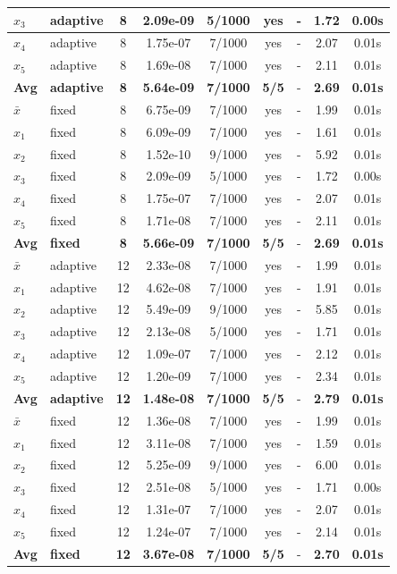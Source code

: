 \begin{longtable}{|l|l|c|c|c|c|c|c|c|}
\hline
$x_3$ & adaptive & 8 & 2.09e-09 & 5/1000 & yes & - & 1.72 & 0.00s \\
\hline
$x_4$ & adaptive & 8 & 1.75e-07 & 7/1000 & yes & - & 2.07 & 0.01s \\
\hline
$x_5$ & adaptive & 8 & 1.69e-08 & 7/1000 & yes & - & 2.11 & 0.01s \\
\hline
\hline\hline
\textbf{Avg} & \textbf{adaptive} & \textbf{8} & \textbf{5.64e-09} & \textbf{7/1000} & \textbf{5/5} & - & \textbf{2.69} & \textbf{0.01s} \\
\hline\hline
\hline
$\bar{x}$ & fixed & 8 & 6.75e-09 & 7/1000 & yes & - & 1.99 & 0.01s \\
\hline
$x_1$ & fixed & 8 & 6.09e-09 & 7/1000 & yes & - & 1.61 & 0.01s \\
\hline
$x_2$ & fixed & 8 & 1.52e-10 & 9/1000 & yes & - & 5.92 & 0.01s \\
\hline
$x_3$ & fixed & 8 & 2.09e-09 & 5/1000 & yes & - & 1.72 & 0.00s \\
\hline
$x_4$ & fixed & 8 & 1.75e-07 & 7/1000 & yes & - & 2.07 & 0.01s \\
\hline
$x_5$ & fixed & 8 & 1.71e-08 & 7/1000 & yes & - & 2.11 & 0.01s \\
\hline
\hline\hline
\textbf{Avg} & \textbf{fixed} & \textbf{8} & \textbf{5.66e-09} & \textbf{7/1000} & \textbf{5/5} & - & \textbf{2.69} & \textbf{0.01s} \\
\hline\hline
$\bar{x}$ & adaptive & 12 & 2.33e-08 & 7/1000 & yes & - & 1.99 & 0.01s \\
\hline
$x_1$ & adaptive & 12 & 4.62e-08 & 7/1000 & yes & - & 1.91 & 0.01s \\
\hline
$x_2$ & adaptive & 12 & 5.49e-09 & 9/1000 & yes & - & 5.85 & 0.01s \\
\hline
$x_3$ & adaptive & 12 & 2.13e-08 & 5/1000 & yes & - & 1.71 & 0.01s \\
\hline
$x_4$ & adaptive & 12 & 1.09e-07 & 7/1000 & yes & - & 2.12 & 0.01s \\
\hline
$x_5$ & adaptive & 12 & 1.20e-09 & 7/1000 & yes & - & 2.34 & 0.01s \\
\hline
\hline\hline
\textbf{Avg} & \textbf{adaptive} & \textbf{12} & \textbf{1.48e-08} & \textbf{7/1000} & \textbf{5/5} & - & \textbf{2.79} & \textbf{0.01s} \\
\hline\hline
\hline
$\bar{x}$ & fixed & 12 & 1.36e-08 & 7/1000 & yes & - & 1.99 & 0.01s \\
\hline
$x_1$ & fixed & 12 & 3.11e-08 & 7/1000 & yes & - & 1.59 & 0.01s \\
\hline
$x_2$ & fixed & 12 & 5.25e-09 & 9/1000 & yes & - & 6.00 & 0.01s \\
\hline
$x_3$ & fixed & 12 & 2.51e-08 & 5/1000 & yes & - & 1.71 & 0.00s \\
\hline
$x_4$ & fixed & 12 & 1.31e-07 & 7/1000 & yes & - & 2.07 & 0.01s \\
\hline
$x_5$ & fixed & 12 & 1.24e-07 & 7/1000 & yes & - & 2.14 & 0.01s \\
\hline
\hline\hline
\textbf{Avg} & \textbf{fixed} & \textbf{12} & \textbf{3.67e-08} & \textbf{7/1000} & \textbf{5/5} & - & \textbf{2.70} & \textbf{0.01s} \\
\hline\hline
\end{longtable}


